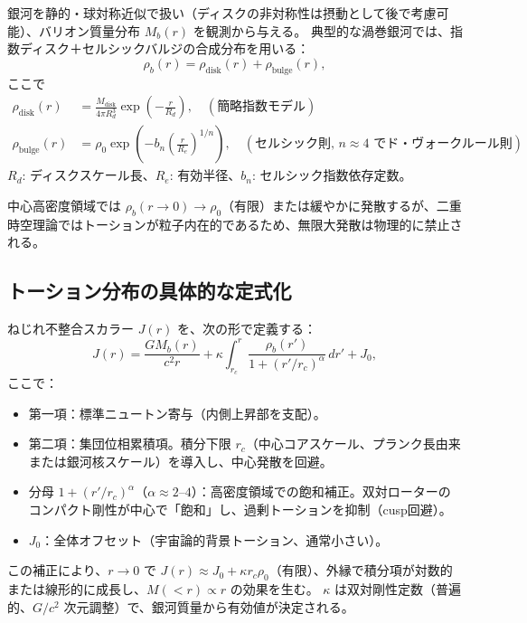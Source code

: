 \documentclass[dvipdfmx,a4paper]{jsbook}
\theoremstyle{definition}
\theoremstyle{remark}
\begin{document}
銀河を静的・球対称近似で扱い（ディスクの非対称性は摂動として後で考慮可能）、バリオン質量分布 $M_b(r)$ を観測から与える。  
典型的な渦巻銀河では、指数ディスク＋セルシックバルジの合成分布を用いる：
\begin{equation}
  \rho_b(r) = \rho_\text{disk}(r) + \rho_\text{bulge}(r),
\end{equation}
ここで
\begin{align}
  \rho_\text{disk}(r) &= \frac{M_\text{disk}}{4\pi R_d^3} \exp\left(-\frac{r}{R_d}\right), \quad (\text{簡略指数モデル}) \\
  \rho_\text{bulge}(r) &= \rho_0 \exp\left(-b_n \left(\frac{r}{R_e}\right)^{1/n}\right), \quad (\text{セルシック則, } n\approx4 \text{ でド・ヴォークルール則})
\end{align}
$R_d$: ディスクスケール長、$R_e$: 有効半径、$b_n$: セルシック指数依存定数。

中心高密度領域では $\rho_b(r \to 0) \to \rho_0$（有限）または緩やかに発散するが、二重時空理論ではトーションが粒子内在的であるため、無限大発散は物理的に禁止される。

\subsection{トーション分布の具体的な定式化}

ねじれ不整合スカラー $J(r)$ を、次の形で定義する：
\begin{equation}
  J(r) = \frac{G M_b(r)}{c^2 r} + \kappa \int_{r_c}^r \frac{\rho_b(r')}{1 + (r'/r_c)^\alpha} \, dr' + J_0,
  \label{eq:J-distribution-specific}
\end{equation}
ここで：
\begin{itemize}
  \item 第一項：標準ニュートン寄与（内側上昇部を支配）。
  \item 第二項：集団位相累積項。積分下限 $r_c$（中心コアスケール、プランク長由来または銀河核スケール）を導入し、中心発散を回避。
  \item 分母 $1 + (r'/r_c)^\alpha$（$\alpha \approx 2$--$4$）：高密度領域での飽和補正。双対ローターのコンパクト剛性が中心で「飽和」し、過剰トーションを抑制（cusp回避）。
  \item $J_0$：全体オフセット（宇宙論的背景トーション、通常小さい）。
\end{itemize}

この補正により、$r \to 0$ で $J(r) \approx J_0 + \kappa r_c \rho_0$（有限）、外縁で積分項が対数的または線形的に成長し、$M(<r) \propto r$ の効果を生む。  
$\kappa$ は双対剛性定数（普遍的、$G/c^2$ 次元調整）で、銀河質量から有効値が決定される。
\end{document}
